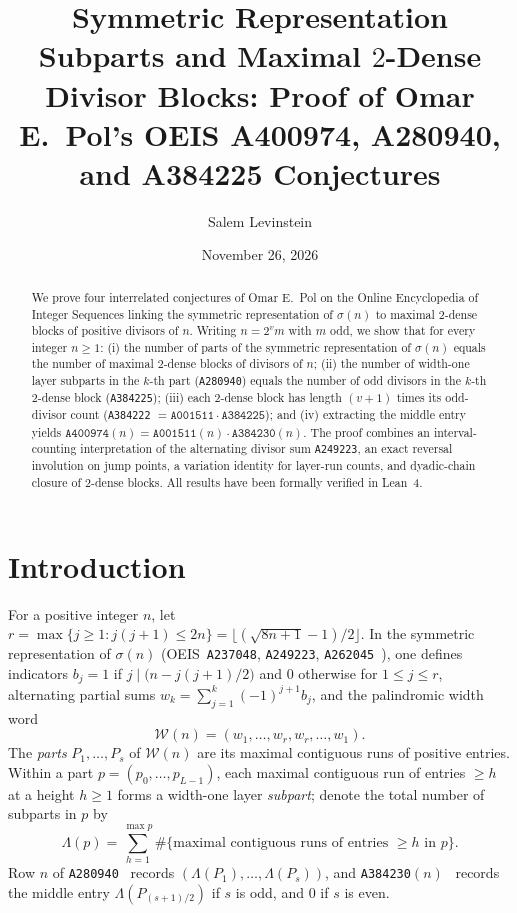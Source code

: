 \documentclass[11pt]{article}
\title{Symmetric Representation Subparts and Maximal $2$-Dense Divisor Blocks: Proof of Omar E.~Pol's OEIS A400974, A280940, and A384225 Conjectures}
\author{Salem Levinstein}
\date{November 26, 2026}
\begin{document}
\maketitle

\begin{abstract}
We prove four interrelated conjectures of Omar E.~Pol on the Online Encyclopedia of Integer Sequences linking the symmetric representation of $\sigma(n)$ to maximal $2$-dense blocks of positive divisors of $n$. Writing $n = 2^v m$ with $m$ odd, we show that for every integer $n \ge 1$: (i) the number of parts of the symmetric representation of $\sigma(n)$ equals the number of maximal $2$-dense blocks of divisors of $n$; (ii) the number of width-one layer subparts in the $k$-th part (\texttt{A280940}) equals the number of odd divisors in the $k$-th $2$-dense block (\texttt{A384225}); (iii) each $2$-dense block has length $(v+1)$ times its odd-divisor count (\texttt{A384222} $= \texttt{A001511} \cdot \texttt{A384225}$); and (iv) extracting the middle entry yields $\texttt{A400974}(n) = \texttt{A001511}(n) \cdot \texttt{A384230}(n)$. The proof combines an interval-counting interpretation of the alternating divisor sum \texttt{A249223}, an exact reversal involution on jump points, a variation identity for layer-run counts, and dyadic-chain closure of $2$-dense blocks. All results have been formally verified in Lean~4.
\end{abstract}

\section{Introduction}

For a positive integer $n$, let $r = \max\{j \ge 1 : j(j+1) \le 2n\} = \lfloor(\sqrt{8n+1}-1)/2\rfloor$. In the symmetric representation of $\sigma(n)$ (OEIS~\texttt{A237048}, \texttt{A249223}, \texttt{A262045}~\cite{OEIS-A262045}), one defines indicators $b_j = 1$ if $j \mid \bigl(n - j(j+1)/2\bigr)$ and $0$ otherwise for $1 \le j \le r$, alternating partial sums $w_k = \sum_{j=1}^k (-1)^{j+1} b_j$, and the palindromic width word
\[
  \mathcal{W}(n) = (w_1, \dots, w_r, w_r, \dots, w_1).
\]
The \emph{parts} $P_1, \dots, P_s$ of $\mathcal{W}(n)$ are its maximal contiguous runs of positive entries. Within a part $p = (p_0, \dots, p_{L-1})$, each maximal contiguous run of entries $\ge h$ at a height $h \ge 1$ forms a width-one layer \emph{subpart}; denote the total number of subparts in $p$ by
\[
  \Lambda(p) = \sum_{h = 1}^{\max p} \#\{\text{maximal contiguous runs of entries } \ge h \text{ in } p\}.
\]
Row $n$ of \texttt{A280940}~\cite{OEIS-A280940} records $(\Lambda(P_1), \dots, \Lambda(P_s))$, and \texttt{A384230}$(n)$~\cite{OEIS-A384230} records the middle entry $\Lambda(P_{(s+1)/2})$ if $s$ is odd, and $0$ if $s$ is even.
\end{document}
